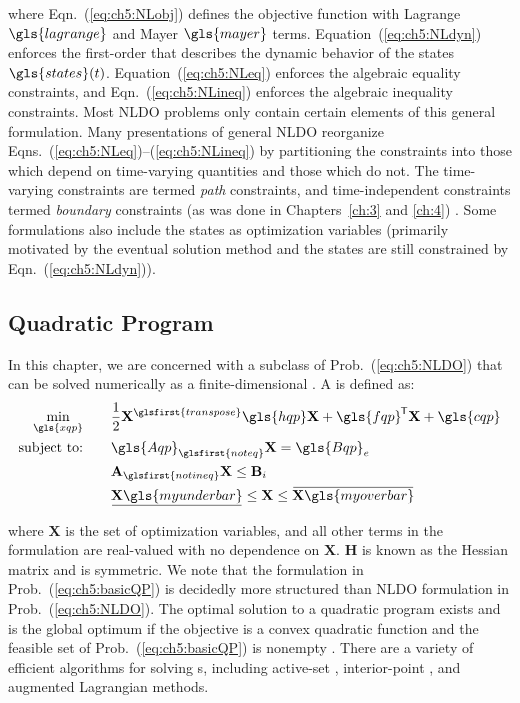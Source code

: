\noindent where Eqn.~(\ref{eq:ch5:NLobj}) defines the objective function with Lagrange $\gls{lagrange}$ and Mayer $\gls{mayer}$ terms.
Equation~(\ref{eq:ch5:NLdyn}) enforces the first-order  that describes the dynamic behavior of the states $\gls{states}(t)$.
Equation~(\ref{eq:ch5:NLeq}) enforces the algebraic equality constraints, and Eqn.~(\ref{eq:ch5:NLineq}) enforces the algebraic inequality constraints.
Most NLDO problems only contain certain elements of this general formulation.
Many presentations of general NLDO reorganize Eqns.~(\ref{eq:ch5:NLeq})--(\ref{eq:ch5:NLineq}) by partitioning the constraints into those which depend on time-varying quantities and those which do not.
The time-varying constraints are termed \textit{path} constraints, and time-independent constraints termed \textit{boundary} constraints (as was done in Chapters~\ref{ch:3} and \ref{ch:4}) \cite{Betts2010a, Biegler2010a, Herber2014a}.
Some formulations also include the states as optimization variables (primarily motivated by the eventual solution method and the states are still constrained by Eqn.~(\ref{eq:ch5:NLdyn})).

\subsection{Quadratic Program}

In this chapter, we are concerned with a subclass of Prob.~(\ref{eq:ch5:NLDO}) that can be solved numerically as a finite-dimensional \qp. A \qp{} is defined as:%
\begin{subequations}%
\label{eq:ch5:basicQP}
\begin{align}
\min_{\gls{xqp}} \qquad& \frac{1}{2}\mathbf{X}^{\glsfirst{transpose}} \gls{hqp} \mathbf{X} + \gls{fqp}\tran \mathbf{X} + \gls{cqp} \label{eq:ch5:qpH} \\
\text{subject to:} \qquad& \gls{Aqp}_{\glsfirst{noteq}} \mathbf{X} = \gls{Bqp}_{e} \label{eq:ch5:Ae} \\
& \mathbf{A}_{\glsfirst{notineq}} \mathbf{X} \leq \mathbf{B}_{i} \label{eq:ch5:Ai} \\
& \myunderbar{\mathbf{X}\gls{myunderbar}} \leq \mathbf{X} \leq \myoverbar{\mathbf{X}\gls{myoverbar}} \label{eq:ch5:qpbounds}
\end{align}
\end{subequations}%

\noindent where $\mathbf{X}$ is the set of optimization variables, and all other terms in the formulation are real-valued with no dependence on $\mathbf{X}$.
$\mathbf{H}$ is known as the Hessian matrix and is symmetric.
We note that the \qp{} formulation in Prob.~(\ref{eq:ch5:basicQP}) is decidedly more structured than NLDO formulation in Prob.~(\ref{eq:ch5:NLDO}).
The optimal solution to a quadratic program exists and is the global optimum if the objective is a convex quadratic function and the feasible set of Prob.~(\ref{eq:ch5:basicQP}) is nonempty \cite{Pang1983a}.
There are a variety of efficient algorithms for solving {\qp}s, including  active-set \cite{Pang1983a}, interior-point \cite{Altman1999a}, and augmented Lagrangian \cite{Delbos2005a} methods.

